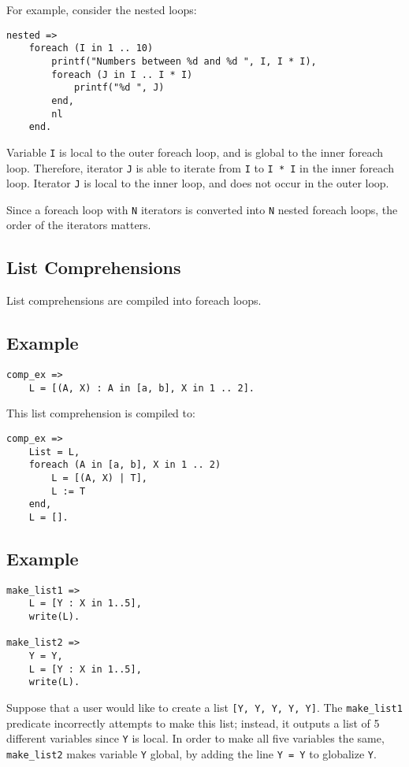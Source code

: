For example, consider the nested loops:
\begin{verbatim}
nested =>
    foreach (I in 1 .. 10)
        printf("Numbers between %d and %d ", I, I * I),
        foreach (J in I .. I * I)
            printf("%d ", J)
        end,
        nl
    end.
\end{verbatim}
Variable \texttt{I} is local to the outer foreach loop, and is global to the inner foreach loop.  Therefore, iterator \texttt{J} is able to iterate from \texttt{I} to \texttt{I * I} in the inner foreach loop.  Iterator \texttt{J} is local to the inner loop, and does not occur in the outer loop.

Since a foreach loop with \texttt{N} iterators is converted into \texttt{N} nested foreach loops, the order of the iterators matters.  

\subsection{List Comprehensions}
List comprehensions are compiled into foreach loops.

\subsection*{Example}
\begin{verbatim}
comp_ex =>
    L = [(A, X) : A in [a, b], X in 1 .. 2].
\end{verbatim}
This list comprehension is compiled to:
\begin{verbatim}
comp_ex =>
    List = L, 
    foreach (A in [a, b], X in 1 .. 2)
        L = [(A, X) | T], 
        L := T
    end,
    L = [].
\end{verbatim}

\subsection*{Example}
\begin{verbatim}
make_list1 =>
    L = [Y : X in 1..5],
    write(L).

make_list2 =>
    Y = Y,
    L = [Y : X in 1..5],
    write(L).
\end{verbatim}
Suppose that a user would like to create a list \texttt{[Y, Y, Y, Y, Y]}.  The \texttt{make\_list1} predicate incorrectly attempts to make this list; instead, it outputs a list of 5 different variables since \texttt{Y} is local.  In order to make all five variables the same, \texttt{make\_list2} makes variable \texttt{Y} global, by adding the line \texttt{Y = Y} to globalize \texttt{Y}.

\ignore{

}
